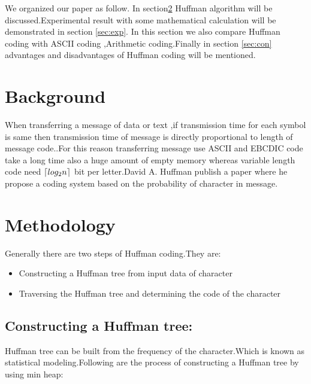 \documentclass[conference]{IEEEtran}
\DeclarePairedDelimiter\ceil{\lceil}{\rceil}
\begin{document}
\par We organized our paper as follow. In section\ref{sec:meth} Huffman algorithm will be discussed.Experimental result with some mathematical calculation will be demonstrated in
section \ref{sec:exp}. In this section we also compare Huffman coding with ASCII coding ,Arithmetic coding.Finally in section \ref{sec:con} advantages and disadvantages of Huffman coding will be mentioned.    

\section{Background}
When transferring a message of data or text ,if transmission time for each symbol is same then  transmission time of message is directly proportional to length of message code.\cite{huffman1952method}.For this reason transferring message use ASCII and EBCDIC  code take a long time also a huge amount of empty memory whereas variable length code need $\ceil*{log_2n}$ bit per letter\cite{vitter1987design}.David A. Huffman publish a paper where he propose a coding system based on the probability of character in message. 


\section{Methodology}
\label{sec:meth}
Generally there are two steps of Huffman coding.They are:
\begin{itemize}
  \item Constructing a Huffman tree from input data of character
  \item Traversing the Huffman tree and determining the code of the character
\end{itemize}
\subsection{\textbf{Constructing a Huffman tree:}}

Huffman tree can be built from the frequency of the character.Which is known as statistical modeling.\cite{nelson1995data}Following are the process\cite{sharma2010compression} of constructing a Huffman tree by using min heap:
\renewcommand{\labelenumi}{\roman{enumi}}
\end{document}
